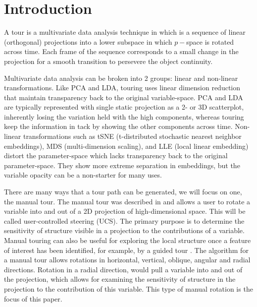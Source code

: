 \documentclass{monashthesis}
\begin{document}
\section{Introduction}\label{introduction}

A tour is a multivariate data analysis technique in which is a sequence
of linear (orthogonal) projections into a lower subspace in which
\(p-\)space is rotated across time. Each frame of the sequence
corresponds to a small change in the projection for a smooth transition
to persevere the object continuity.

Multivariate data analysis can be broken into 2 groups: linear and
non-linear transformations. Like PCA and LDA, touring uses linear
dimension reduction that maintain transparency back to the original
variable-space. PCA and LDA are typically represented with single static
projection as a 2- or 3D scatterplot, inherently losing the variation
held with the high components, whereas touring keep the information in
tack by showing the other components across time. Non-linear
transformations such as tSNE (t-distributed stochastic nearest neighbor
embeddings), MDS (multi-dimension scaling), and LLE (local linear
embedding) distort the parameter-space which lacks transparency back to
the original parameter-space. They show more extreme separation in
embeddings, but the variable opacity can be a non-starter for many uses.

There are many ways that a tour path can be generated, we will focus on
one, the manual tour. The manual tour was described in
\textcite{cook_manual_1997} and allows a user to rotate a variable into
and out of a 2D projection of high-dimensional space. This will be
called user-controlled steering (UCS). The primary purpose is to
determine the sensitivity of structure visible in a projection to the
contributions of a variable. Manual touring can also be useful for
exploring the local structure once a feature of interest has been
identified, for example, by a guided tour \autocite{cook_grand_1995}.
The algorithm for a manual tour allows rotations in horizontal,
vertical, oblique, angular and radial directions. Rotation in a radial
direction, would pull a variable into and out of the projection, which
allows for examining the sensitivity of structure in the projection to
the contribution of this variable. This type of manual rotation is the
focus of this paper.
\end{document}
